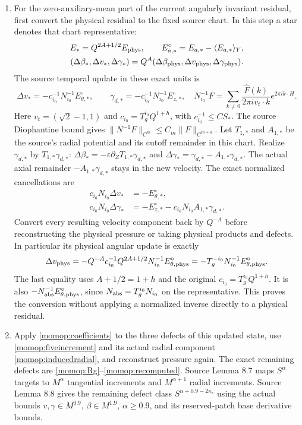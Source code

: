 \documentclass[11pt]{article}
\begin{document}
\begin{enumerate}
\item For the zero-auxiliary-mean part of the current angularly
invariant residual, first convert the physical residual to the fixed
source chart. In this step a star denotes that chart representative:
\[
\begin{gathered}
 E_*=Q^{2A+1/2}E_{\rm phys},\qquad
 E_{a,*}^\circ=E_{a,*}-\langle E_{a,*}\rangle_Y,\\
 (\Delta\beta_*,\Delta v_*,\Delta\gamma_*)
       =Q^A(\Delta\beta_{\rm phys},\Delta v_{\rm phys},
                                      \Delta\gamma_{\rm phys}).
\end{gathered}
\]
The source temporal update in these exact units is
\[
 \Delta v_*=-c_{i_0}^{-1}N_{i_0}^{-1}E_{\theta,*}^\circ,\qquad
 \gamma_{d,*}=-c_{i_0}^{-1}N_{i_0}^{-1}E_{z,*}^\circ,
 \quad
 N_{i_0}^{-1}F=
 \sum_{k\ne0}\frac{\widehat F(k)}{2\pi i v_t\cdot k}e^{2\pi ik\cdot H}.
\]
Here $v_t=(\sqrt2-1,1)$ and
$c_{i_0}=T_g^{i_0}Q^{1+h}$, with $c_{i_0}^{-1}\le CS_*$.
The source Diophantine bound gives
$\|N^{-1}F\|_{C^m}\le C_m\|F\|_{C^{m+4}}$.
Let $T_{1,*}$ and $A_{1,*}$ be the source's radial potential and
its cutoff remainder in this chart. Realize $\gamma_{d,*}$ by
$T_{1,*}\gamma_{d,*}$:
$\Delta\beta_*=-\varepsilon\partial_ZT_{1,*}\gamma_{d,*}$ and
$\Delta\gamma_*=\gamma_{d,*}-A_{1,*}\gamma_{d,*}$.
The actual axial remainder $-A_{1,*}\gamma_{d,*}$ stays in the
new velocity. The exact normalized cancellations are
\[
\begin{split}
 c_{i_0}N_{i_0}\Delta v_*&=-E_{\theta,*}^\circ,\\
 c_{i_0}N_{i_0}\Delta\gamma_*&=-E_{z,*}^\circ
              -c_{i_0}N_{i_0}A_{1,*}\gamma_{d,*}.
\end{split}
\]
Convert every resulting velocity component back by $Q^{-A}$ before
reconstructing the physical pressure or taking physical products and
defects. In particular its physical angular update is exactly
\[
 \Delta v_{\rm phys}
  =-Q^{-A}c_{i_0}^{-1}Q^{2A+1/2}
                     N_{i_0}^{-1}E_{\theta,\rm phys}^\circ
  =-T_g^{-i_0}N_{i_0}^{-1}E_{\theta,\rm phys}^\circ .
\]
The last equality uses $A+1/2=1+h$ and the original
$c_{i_0}=T_g^{i_0}Q^{1+h}$. It is also
$-N_{\rm abs}^{-1}E_{\theta,\rm phys}^\circ$, since
$N_{\rm abs}=T_g^{i_0}N_{i_0}$ on the representative.
This proves the conversion without applying a normalized inverse
directly to a physical residual.

\item Apply \eqref{momop:coefficients} to the three defects of this
updated state, use \eqref{momop:fiveincrement} and its actual
radial component \eqref{momop:inducedradial}, and reconstruct
pressure again. The exact remaining defects are
\eqref{momop:Rg}--\eqref{momop:recomputed}.
Source Lemma 8.7 maps $S^\alpha$ targets to $M^\alpha$
tangential increments and $M^{\alpha+1}$ radial increments.
Source Lemma 8.8 gives the remaining defect class
$S^{\alpha+0.9-2\kappa_s}$ using the actual bounds
$v,\gamma\in M^{0.9}$, $\beta\in M^{1.9}$, $\alpha\ge0.9$,
and its reserved-patch base derivative bounds.
\end{enumerate}
\end{document}
